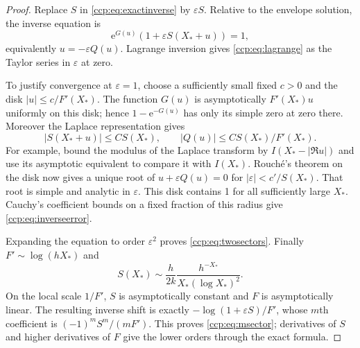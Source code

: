 \documentclass[11pt,letterpaper]{article}
\theoremstyle{remark}\newtheorem{remark}[theorem]{Remark}
\newcommand{\ee}{\mathrm e}
\begin{document}
\begin{proof}
Replace $S$ in \eqref{ccp:eq:exactinverse} by $\varepsilon S$. Relative to the envelope solution, the inverse equation is
\[
\ee^{G(u)}(1+\varepsilon S(X_*+u))=1,
\]
equivalently $u=-\varepsilon Q(u)$. Lagrange inversion gives \eqref{ccp:eq:lagrange} as the Taylor series in $\varepsilon$ at zero.

To justify convergence at $\varepsilon=1$, choose a sufficiently small fixed $c>0$ and the disk $|u|\le c/F'(X_*)$. The function $G(u)$ is asymptotically $F'(X_*)u$ uniformly on this disk; hence $1-\ee^{-G(u)}$ has only its simple zero at zero there. Moreover the Laplace representation gives
\[
|S(X_*+u)|\le C S(X_*),\qquad
|Q(u)|\le C S(X_*)/F'(X_*).
\]
For example, bound the modulus of the Laplace transform by $I(X_*-|\Re u|)$ and use its asymptotic equivalent to compare it with $I(X_*)$. Rouch\'e's theorem on the disk now gives a unique root of $u+\varepsilon Q(u)=0$ for $|\varepsilon|<c'/S(X_*)$. That root is simple and analytic in $\varepsilon$. This disk contains 1 for all sufficiently large $X_*$. Cauchy's coefficient bounds on a fixed fraction of this radius give \eqref{ccp:eq:inverseerror}.

Expanding the equation to order $\varepsilon^2$ proves \eqref{ccp:eq:twosectors}. Finally $F'\sim\log(hX_*)$ and
\[
S(X_*)\sim\frac h{2k}\frac{h^{-X_*}}{X_*(\log X_*)^2}.
\]
On the local scale $1/F'$, $S$ is asymptotically constant and $F$ is asymptotically linear. The resulting inverse shift is exactly $-\log(1+\varepsilon S)/F'$, whose $m$th coefficient is $(-1)^mS^m/(mF')$. This proves \eqref{ccp:eq:msector}; derivatives of $S$ and higher derivatives of $F$ give the lower orders through the exact formula.
\end{proof}
\end{document}
